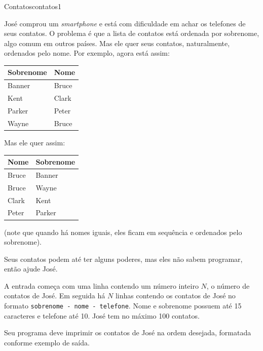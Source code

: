 \documentclass[12pt,a4paper,oneside]{article}
\begin{document}
\begin{problem}{Contatos}{contatos}{1}
 
José comprou um \textit{smartphone} e está com dificuldade em achar os telefones de seus contatos. O problema é que a lista de contatos está ordenada por sobrenome, algo comum em outros países. Mas ele quer seus contatos, naturalmente, ordenados pelo nome. Por exemplo, agora está assim:

\begin{center}
\begin{tabular}{l|l}
    Sobrenome & Nome \\
    \hline
    Banner & Bruce \\
    Kent & Clark \\
    Parker & Peter\\
    Wayne & Bruce
\end{tabular}
\end{center}

Mas ele quer assim:

\begin{center}
\begin{tabular}{l|l}
    Nome & Sobrenome \\
    \hline
    Bruce & Banner \\
    Bruce & Wayne \\
    Clark & Kent \\
    Peter & Parker\\
\end{tabular}
\end{center}

(note que quando há nomes iguais, eles ficam em sequência e ordenados pelo sobrenome).

Seus contatos podem até ter alguns poderes, mas eles não sabem programar, então ajude José.

%

\InputFile

A entrada começa com uma linha contendo um número inteiro $N$, o número de contatos de José. Em seguida há $N$ linhas contendo os contatos de José no formato \texttt{sobrenome - nome - telefone}. Nome e sobrenome possuem até 15 caracteres e telefone até 10. José tem no máximo 100 contatos.

\OutputFile

Seu programa deve imprimir os contatos de José na ordem desejada, formatada conforme exemplo de saída.


\Example

\begin{example}
%
\end{example}




\end{problem}
\end{document}
